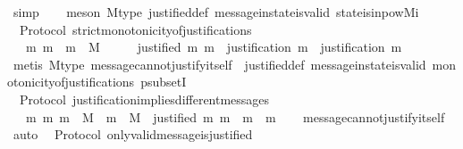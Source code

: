 \begin{isabellebody}
\isamarkupfalse%
\ simp\isanewline
\ \ \isamarkupfalse%
\ {\isacharparenleft}meson\ M{\isacharunderscore}type\ justified{\isacharunderscore}def\ message{\isacharunderscore}in{\isacharunderscore}state{\isacharunderscore}is{\isacharunderscore}valid\ state{\isacharunderscore}is{\isacharunderscore}in{\isacharunderscore}pow{\isacharunderscore}Mi{\isacharparenright}%
\endisatagproof
{\isafoldproof}%
%
\isadelimproof
\isanewline
%
\endisadelimproof
\isanewline
{}\isamarkupfalse%
\ {\isacharparenleft}\ Protocol{\isacharparenright}\ strict{\isacharunderscore}monotonicity{\isacharunderscore}of{\isacharunderscore}justifications\ {\isacharcolon}\isanewline
\ \ {\isachardoublequoteopen}{\isasymforall}\ m\ m{\isacharprime}\ {\isasymsigma}{\isachardot}\ m\ {\isasymin}\ M\ {\isasymand}\ {\isasymsigma}\ {\isasymin}\ {\isasymSigma}\ {\isasymand}\ justified\ m{\isacharprime}\ m\ {\isasymlongrightarrow}\ justification\ m{\isacharprime}\ {\isasymsubset}\ justification\ m{\isachardoublequoteclose}\isanewline
%
\isadelimproof
\ \ %
\endisadelimproof
%
\isatagproof
{}\isamarkupfalse%
\ {\isacharparenleft}metis\ M{\isacharunderscore}type\ message{\isacharunderscore}cannot{\isacharunderscore}justify{\isacharunderscore}itself\ \ justified{\isacharunderscore}def\ message{\isacharunderscore}in{\isacharunderscore}state{\isacharunderscore}is{\isacharunderscore}valid\ monotonicity{\isacharunderscore}of{\isacharunderscore}justifications\ psubsetI{\isacharparenright}%
\endisatagproof
{\isafoldproof}%
%
\isadelimproof
\isanewline
%
\endisadelimproof
\isanewline
{}\isamarkupfalse%
\ {\isacharparenleft}\ Protocol{\isacharparenright}\ justification{\isacharunderscore}implies{\isacharunderscore}different{\isacharunderscore}messages\ {\isacharcolon}\isanewline
\ \ {\isachardoublequoteopen}{\isasymforall}\ m\ m{\isacharprime}{\isachardot}\ m\ {\isasymin}\ M\ {\isasymand}\ m{\isacharprime}\ {\isasymin}\ M\ {\isasymlongrightarrow}\ justified\ m{\isacharprime}\ m\ {\isasymlongrightarrow}\ m\ {\isasymnoteq}\ m{\isacharprime}{\isachardoublequoteclose}\isanewline
%
\isadelimproof
\ \ %
\endisadelimproof
%
\isatagproof
{}\isamarkupfalse%
\ message{\isacharunderscore}cannot{\isacharunderscore}justify{\isacharunderscore}itself\ \isamarkupfalse%
\ auto%
\endisatagproof
{\isafoldproof}%
%
\isadelimproof
\isanewline
%
\endisadelimproof
\isanewline
{}\isamarkupfalse%
\ {\isacharparenleft}\ Protocol{\isacharparenright}\ only{\isacharunderscore}valid{\isacharunderscore}message{\isacharunderscore}is{\isacharunderscore}justified\ {\isacharcolon}\isanewline

\end{isabellebody}
